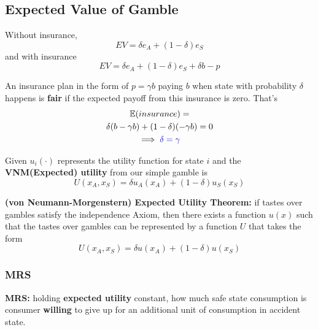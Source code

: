 \documentclass[]{article}
\begin{document}
        \subsection{Expected Value of Gamble}
            \par Without insurance, 
            \[
                EV = \delta e_A + (1 - \delta)e_S
            \]
            and with insurance
            \[
                EV = \delta e_A + (1 - \delta) e_S + \delta b - p
            \]
            \begin{definition}
                An insurance plan in the form of $p = \gamma b$ paying $b$ when state with probability $\delta$ happens is \textbf{fair} if the expected payoff from this insurance is zero. That's 
                \begin{gather*}
                    \mathbb{E}(insurance) = \\
                    \delta (b - \gamma b) + (1 - \delta) (- \gamma b) = 0\\
                    \implies \textcolor{blue}{\delta = \gamma}
                \end{gather*}
            \end{definition}    
            
            \begin{definition}
                Given $u_i(\cdot)$ represents the utility function for state $i$ and the \textbf{VNM(Expected) utility} from our simple gamble is 
                \[
                    U(x_A, x_S) = \delta u_A(x_A) + (1 - \delta)u_S(x_S)
                \]
            \end{definition}
            
            \begin{theorem}
                \textbf{(von Neumann-Morgenstern) Expected Utility Theorem: } if tastes over gambles satisfy the independence Axiom, then there exists a function $u(x)$ such that the tastes over gambles can be represented by a function $U$ that takes the form
                \[
                    U(x_A, x_S) = \delta u(x_A) + (1 - \delta) u(x_S)
                \]
            \end{theorem}
        
            \subsubsection{MRS}
                \begin{definition}
                    \textbf{MRS: } holding \textbf{expected utility} constant, how much safe state consumption is consumer \textbf{willing} to give up for an additional unit of consumption in accident state.
                \end{definition}
                
\end{document}
